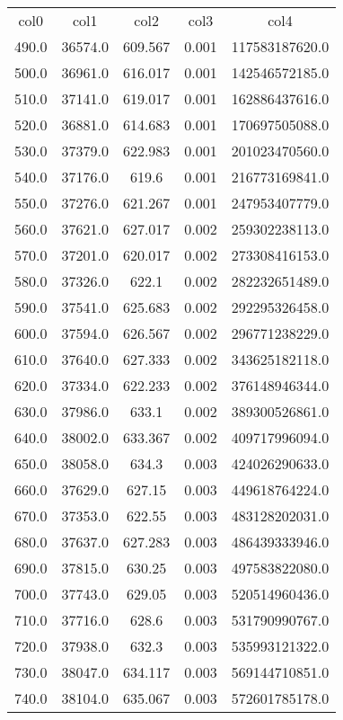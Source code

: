 \begin{table}
\begin{tabular}{ccccc}
col0 & col1 & col2 & col3 & col4 \\
490.0 & 36574.0 & 609.567 & 0.001 & 117583187620.0 \\
500.0 & 36961.0 & 616.017 & 0.001 & 142546572185.0 \\
510.0 & 37141.0 & 619.017 & 0.001 & 162886437616.0 \\
520.0 & 36881.0 & 614.683 & 0.001 & 170697505088.0 \\
530.0 & 37379.0 & 622.983 & 0.001 & 201023470560.0 \\
540.0 & 37176.0 & 619.6 & 0.001 & 216773169841.0 \\
550.0 & 37276.0 & 621.267 & 0.001 & 247953407779.0 \\
560.0 & 37621.0 & 627.017 & 0.002 & 259302238113.0 \\
570.0 & 37201.0 & 620.017 & 0.002 & 273308416153.0 \\
580.0 & 37326.0 & 622.1 & 0.002 & 282232651489.0 \\
590.0 & 37541.0 & 625.683 & 0.002 & 292295326458.0 \\
600.0 & 37594.0 & 626.567 & 0.002 & 296771238229.0 \\
610.0 & 37640.0 & 627.333 & 0.002 & 343625182118.0 \\
620.0 & 37334.0 & 622.233 & 0.002 & 376148946344.0 \\
630.0 & 37986.0 & 633.1 & 0.002 & 389300526861.0 \\
640.0 & 38002.0 & 633.367 & 0.002 & 409717996094.0 \\
650.0 & 38058.0 & 634.3 & 0.003 & 424026290633.0 \\
660.0 & 37629.0 & 627.15 & 0.003 & 449618764224.0 \\
670.0 & 37353.0 & 622.55 & 0.003 & 483128202031.0 \\
680.0 & 37637.0 & 627.283 & 0.003 & 486439333946.0 \\
690.0 & 37815.0 & 630.25 & 0.003 & 497583822080.0 \\
700.0 & 37743.0 & 629.05 & 0.003 & 520514960436.0 \\
710.0 & 37716.0 & 628.6 & 0.003 & 531790990767.0 \\
720.0 & 37938.0 & 632.3 & 0.003 & 535993121322.0 \\
730.0 & 38047.0 & 634.117 & 0.003 & 569144710851.0 \\
740.0 & 38104.0 & 635.067 & 0.003 & 572601785178.0 \\

\end{tabular}
\end{table}
